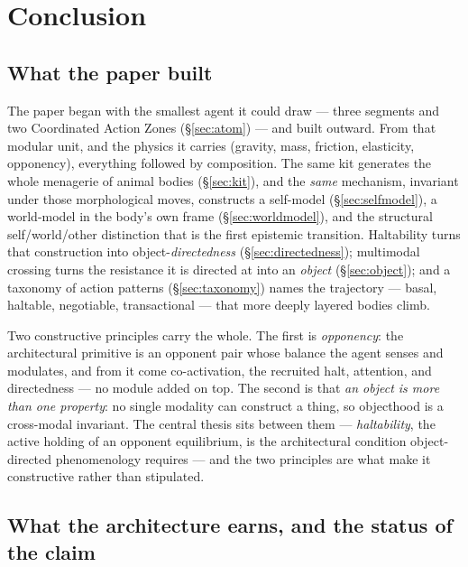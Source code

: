 \documentclass{article}
\begin{document}
\section{Conclusion}\label{sec:conclusion}

\subsection*{What the paper built}

The paper began with the smallest agent it could draw --- three segments
and two Coordinated Action Zones (\S\ref{sec:atom}) --- and built
outward.  From that modular unit, and the physics it carries (gravity, mass,
friction, elasticity, opponency), everything followed by composition.
The same kit generates the whole menagerie of animal bodies
(\S\ref{sec:kit}), and the \emph{same} mechanism, invariant under those
morphological moves, constructs a self-model (\S\ref{sec:selfmodel}), a
world-model in the body's own frame (\S\ref{sec:worldmodel}), and the
structural self/world/other distinction that is the first epistemic
transition.  Haltability turns that construction into
object-\emph{directedness} (\S\ref{sec:directedness}); multimodal
crossing turns the resistance it is directed at into an
\emph{object} (\S\ref{sec:object}); and a taxonomy of action patterns
(\S\ref{sec:taxonomy}) names the trajectory --- basal, haltable,
negotiable, transactional --- that more deeply layered bodies climb.

Two constructive principles carry the whole.  The first is
\emph{opponency}: the architectural primitive is an opponent pair whose
balance the agent senses and modulates, and from it come co-activation,
the recruited halt, attention, and directedness --- no module added on
top.  The second is that \emph{an object is more than one property}: no
single modality can construct a thing, so objecthood is a cross-modal
invariant.  The central thesis sits between them --- \emph{haltability},
the active holding of an opponent equilibrium, is the architectural
condition object-directed phenomenology requires
\citep{Husserl1900_LU,Husserl1913_Ideas} --- and the two principles are
what make it constructive rather than stipulated.

\subsection*{What the architecture earns, and the status of the claim}
\end{document}

